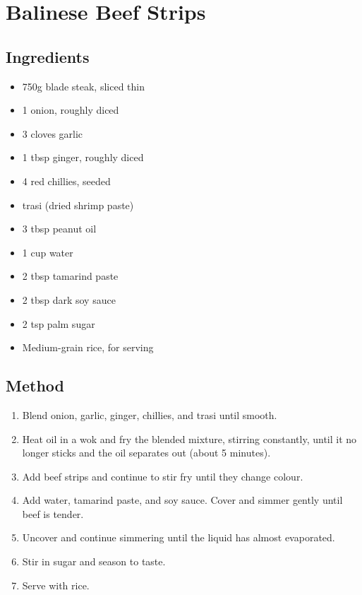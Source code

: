 \clearpage
\section{Balinese Beef Strips}

\subsection{Ingredients}

\begin{itemize}
    \item 750g blade steak, sliced thin
    \item 1 onion, roughly diced
    \item 3 cloves garlic
    \item 1 tbsp ginger, roughly diced
    \item 4 red chillies, seeded
    \item {} trasi (dried shrimp paste)
    \item 3 tbsp peanut oil
    \item 1 cup water
    \item 2 tbsp tamarind paste
    \item 2 tbsp dark soy sauce
    \item 2 tsp palm sugar
    \item Medium-grain rice, for serving
\end{itemize}

\subsection{Method}

\begin{enumerate}
    \item Blend onion, garlic, ginger, chillies, and trasi until smooth.
    \item Heat oil in a wok and fry the blended mixture, stirring constantly, until it no longer sticks and the oil separates out (about 5 minutes).
    \item Add beef strips and continue to stir fry until they change colour.
    \item Add water, tamarind paste, and soy sauce. Cover and simmer gently until beef is tender.
    \item Uncover and continue simmering until the liquid has almost evaporated.
    \item Stir in sugar and season to taste.
    \item Serve with rice.
\end{enumerate}
